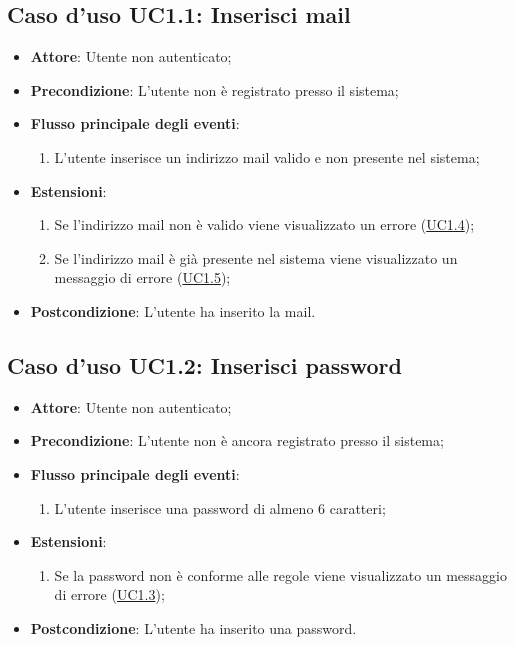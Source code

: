 \documentclass[12pt,a4paper]{article}
\begin{document}
\subsection{Caso d'uso UC1.1: Inserisci mail}

\begin{itemize}

\item \textbf{Attore}: Utente non autenticato; 
\item \textbf{Precondizione}: L'utente non è registrato presso il sistema;

\item \textbf{Flusso principale degli eventi}:
\begin{enumerate}
	\item L'utente inserisce un indirizzo mail valido e non presente nel sistema;
	
\end{enumerate}
\item \textbf{Estensioni}:
\begin{enumerate}
	\item Se l'indirizzo mail non è valido viene visualizzato un errore (\hyperlink{UC1.4}{UC1.4});
	\item Se l'indirizzo mail è già presente nel sistema viene visualizzato un messaggio di errore (\hyperlink{UC1.5}{UC1.5});
	
\end{enumerate}
\item \textbf{Postcondizione}: L'utente ha inserito la mail.
\end{itemize}
\hypertarget{UC1.2}{}
\subsection{Caso d'uso UC1.2: Inserisci password}

\begin{itemize}

\item \textbf{Attore}: Utente non autenticato; 
\item \textbf{Precondizione}: L’utente non è ancora registrato presso il sistema;

\item \textbf{Flusso principale degli eventi}:
\begin{enumerate}
	\item L'utente inserisce una password di almeno 6 caratteri;
	
\end{enumerate}
\item \textbf{Estensioni}:
\begin{enumerate}
	\item Se la password non è conforme alle regole viene visualizzato un messaggio di errore (\hyperlink{UC1.3}{UC1.3});
	
\end{enumerate}
\item \textbf{Postcondizione}: L'utente ha inserito una password.
\end{itemize}
\hypertarget{UC1.3}{}
\end{document}
